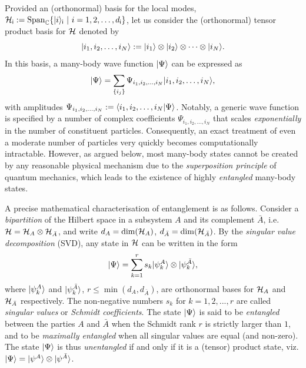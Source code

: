 Provided an (orthonormal) basis for the local modes, $\mathcal{H}_{\mathsf{i}}:= {\rm Span}_{\mathbb C}\{ | i\rangle _{\mathsf{i}} \ |\  i=1,2,\dots, d_{\mathsf{i}} \}$, let us consider the (orthonormal) tensor product basis for $\mathcal{H}$ denoted by
\begin{equation}
	| i_1, i_2, \dots , i_N \rangle := | i_1 \rangle \otimes | i_2 \rangle \otimes \dots \otimes | i_N \rangle.
\end{equation}
In this basis, a many-body wave function $|\Psi\rangle$ can be expressed as
\begin{equation}
	| \Psi \rangle = \sum_{ \{i_j\} } \Psi_{i_1,i_2,\dots,i_N} | i_1, i_2, \dots , i_N \rangle,
\end{equation}
with amplitudes $\Psi_{i_1,i_2,\dots,i_N}:=\langle i_1, i_2, \dots , i_N | \Psi \rangle $. Notably, a generic wave function is specified by a number of complex coefficients $\Psi_{i_1,i_2,\dots,i_N}$ that scales \emph{exponentially} in the number of constituent particles. Consequently, an exact treatment of even a moderate number of particles very quickly becomes computationally intractable. However, as argued below, most many-body states cannot be created by any reasonable physical mechanism due to the \emph{superposition principle} of quantum mechanics, which leads to the existence of highly \emph{entangled} many-body states. 

\bigskip\noindent A precise mathematical characterisation of entanglement is as follows. Consider a \emph{bipartition} of the Hilbert space in a subsystem $A$ and its complement $\bar A$, i.e. $\mathcal{H}=\mathcal{H}_A\otimes \mathcal{H}_{\bar{A}}$, and write $d_A=\dim(\mathcal{H}_A)$,  $d_{\bar{A}}=\dim(\mathcal{H}_{\bar{A}})$. By the \emph{singular value decomposition} (SVD), any state in $\mathcal{H}$ can be written in the form
\begin{equation}\label{eq:SchmidtState}
	\ket{\Psi} = \sum_{k=1}^r s_k | \psi_k^A \rangle \otimes | \psi_k^{\bar{A}} \rangle,
\end{equation}
where $| \psi_k^A \rangle$ and $| \psi_k^{\bar{A}} \rangle$, $r\leq\min(d_A,d_{\bar{A}})$, are orthonormal bases for $\mathcal{H}_A$ and $\mathcal{H}_{\bar{A}}$ respectively. The non-negative numbers $s_k$ for $k=1,2,...,r$ are called \emph{singular values} or \emph{Schmidt coefficients}. The state $| \Psi \rangle$ is said to be \emph{entangled} between the parties $A$ and $\bar A$ when the Schmidt rank $r$ is strictly larger than $1$, and to be \emph{maximally entangled} when all singular values are equal (and non-zero). The state $| \Psi \rangle$ is thus \emph{unentangled} if and only if it is a (tensor) product state, viz. $| \Psi \rangle = | \psi^A \rangle \otimes | \psi^{\bar A} \rangle$.

